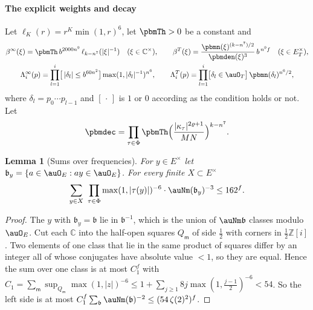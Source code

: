 \documentclass[10pt]{amsart}
\newtheorem{lemma}[theorem]{Lemma}
\theoremstyle{definition}
\theoremstyle{remark}
\newcommand{\C}{\mathbb C}
\newcommand{\Z}{\mathbb Z}
\providecommand{\auPl}{\Phi}
\begin{document}
\paragraph*{The explicit weights and decay}
Let $\ell_K(r)=r^K\min(1,r)^6$, let $\pbmTh>0$ be a constant and
\begin{equation}\label{pbm:eq-beta}
\begin{gathered}
\beta^\infty(\xi)=\pbmTh\,b^{2000n^9}\,\ell_{k-n^7}(|\xi|^{-1})\quad(\xi\in\C^\times),\qquad
\beta^T(\xi)=\frac{\pbmn(\xi)^{(k-n^7)/2}}{\pbmden(\xi)^3}\,b^{\,n^9f}\quad(\xi\in E_T^\times),\\
\Lambda^\infty_i(p)=\prod_{l=1}^i\bigl[\,|\delta_l|\le b^{60n^2}\bigr]\max(1,|\delta_l|^{-1})^{n^6},\qquad
\Lambda^T_i(p)=\prod_{l=1}^i\bigl[\delta_l\in\auO_T\bigr]\,\pbmn(\delta_l)^{n^6/2},
\end{gathered}
\end{equation}
where $\delta_l=p_0\cdots p_{l-1}$ and $[\,\cdot\,]$ is $1$ or $0$ according as the condition holds
or not. Let
\[
\pbmdec=\prod_{\tau\in\auPl}\pbmTh\Bigl(\frac{|\kappa_\tau|^{2\varrho+1}}{MN}\Bigr)^{k-n^7}.
\]

\begin{lemma}[Sums over frequencies]\label{pbm:freq}
For $y\in E^\times$ let $\mathfrak b_y=\{a\in\auO_E:ay\in\auO_E\}$. For every finite $X\subset E^\times$
\[
\sum_{y\in X}\ \prod_{\tau\in\auPl}\max(1,|\tau(y)|)^{-6}\cdot\auNm(\mathfrak b_y)^{-3}\le162^f .
\]
\end{lemma}
\begin{proof}
The $y$ with $\mathfrak b_y=\mathfrak b$ lie in $\mathfrak b^{-1}$, which is the union of $\auNm
\mathfrak b$ classes modulo $\auO_E$. Cut each $\C$ into the half-open squares $Q_{\mathsf m}$ of
side $\frac12$ with corners in $\frac12\Z[i]$. Two elements of one class that lie in the same
product of squares differ by an integer all of whose conjugates have absolute value $<1$, so they
are equal. Hence the sum over one class is at most $C_1^f$ with $C_1=\sum_{\mathsf m}\sup_{Q_{\mathsf
m}}\max(1,|z|)^{-6}\le1+\sum_{j\ge1}8j\max(1,\frac{j-1}2)^{-6}<54$. So the left side is at most
$C_1^f\sum_{\mathfrak b}\auNm(\mathfrak b)^{-2}\le(54\,\zeta(2)^2)^f$.
\end{proof}
\end{document}

